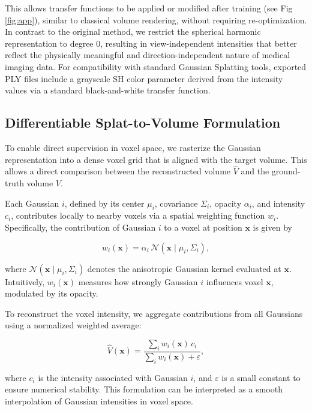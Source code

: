 \documentclass[runningheads]{llncs}
\begin{document}
This allows transfer functions to be applied or modified after training (see Fig \ref{fig:app}), similar to classical volume rendering, without requiring re-optimization. In contrast to the original method, we restrict the spherical harmonic representation to degree 0, resulting in view-independent intensities that better reflect the physically meaningful and direction-independent nature of medical imaging data. For compatibility with standard Gaussian Splatting tools, exported PLY files include a grayscale SH color parameter derived from the intensity values via a standard black-and-white transfer function.

\subsection{Differentiable Splat-to-Volume Formulation}

To enable direct supervision in voxel space, we rasterize the Gaussian representation into a dense voxel grid that is aligned with the target volume. This allows a direct comparison between the reconstructed volume $\hat{V}$ and the ground-truth volume $V$.

Each Gaussian $i$, defined by its center $\mu_i$, covariance $\Sigma_i$, opacity $\alpha_i$, and intensity $c_i$, contributes locally to nearby voxels via a spatial weighting function $w_i$. Specifically, the contribution of Gaussian $i$ to a voxel at position $\mathbf{x}$ is given by

\begin{equation}
w_i(\mathbf{x}) = \alpha_i \, \mathcal{N}(\mathbf{x} \mid \mu_i, \Sigma_i),
\end{equation}

where $\mathcal{N}(\mathbf{x} \mid \mu_i, \Sigma_i)$ denotes the anisotropic Gaussian kernel evaluated at $\mathbf{x}$. Intuitively, $w_i(\mathbf{x})$ measures how strongly Gaussian $i$ influences voxel $\mathbf{x}$, modulated by its opacity.

To reconstruct the voxel intensity, we aggregate contributions from all Gaussians using a normalized weighted average:

\begin{equation}
\hat{V}(\mathbf{x}) = 
\frac{\sum_i w_i(\mathbf{x}) \, c_i}{\sum_i w_i(\mathbf{x}) + \varepsilon},
\end{equation}

where $c_i$ is the intensity associated with Gaussian $i$, and $\varepsilon$ is a small constant to ensure numerical stability. This formulation can be interpreted as a smooth interpolation of Gaussian intensities in voxel space.
\end{document}
